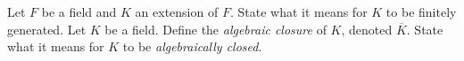 \documentclass{exam}
\begin{document}
\begin{center}
\end{center}
\vspace*{1em}
\begin{questions}
    \question[2]
        Let $F$ be a field and $K$ an extension of $F$. State what it means for $K$ to be finitely generated.
    \question[3]
        Let $K$ be a field. Define the \textit{algebraic closure} of $K$, denoted $\overline{K}$. State what it means for $K$ to be \textit{algebraically closed}.
\end{questions}
\end{document}
